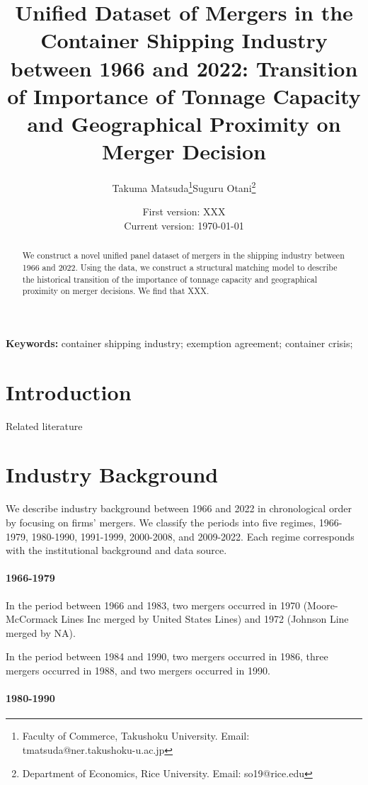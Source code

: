 \documentclass[10pt]{article}
\title{Unified Dataset of Mergers in the Container Shipping Industry between 1966 and 2022: Transition of Importance of Tonnage Capacity and Geographical Proximity on Merger Decision}
\author{Takuma Matsuda\thanks{Faculty of Commerce, Takushoku University. Email: tmatsuda@ner.takushoku-u.ac.jp}\quad Suguru Otani\thanks{Department of Economics, Rice University. Email: so19@rice.edu}}
\date{
First version: XXX\\
Current version: \today
}
\begin{document}
\maketitle

\begin{abstract}
We construct a novel unified panel dataset of mergers in the shipping industry between 1966 and 2022. Using the data, we construct a structural matching model \citep{fox2018estimating} to describe the historical transition of the importance of tonnage capacity and geographical proximity on merger decisions. We find that XXX.
\end{abstract} 

\vspace{0.1in}
\noindent\textbf{Keywords:} container shipping industry; exemption agreement; container crisis; 
\vspace{0in}


\section{Introduction}


Related literature

\section{Industry Background}
We describe industry background between 1966 and 2022 in chronological order by focusing on firms' mergers. We classify the periods into five regimes, 1966-1979, 1980-1990, 1991-1999, 2000-2008, and 2009-2022. Each regime corresponds with the institutional background and data source.


\paragraph{1966-1979} 

\cite{matsuda2022unified}

In the period between 1966 and 1983, two mergers occurred in 1970 (Moore-McCormack Lines Inc merged by United States Lines) and 1972 (Johnson Line merged by NA).

In the period between 1984 and 1990, two mergers occurred in 1986, three mergers occurred in 1988, and two mergers occurred in 1990. 


\paragraph{1980-1990}
\end{document}
